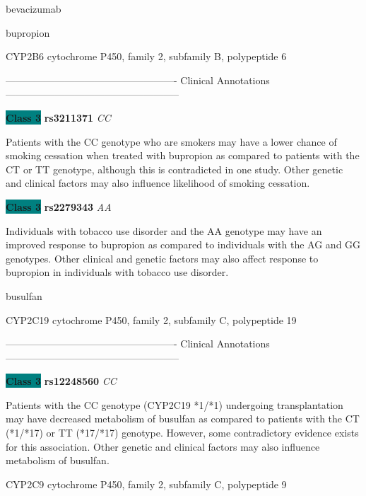 \documentclass{resume} %
\begin{document}
\begin{rSection}{ bevacizumab }
\end{rSection}\begin{rSection}{ bupropion }
\item[]

\begin{rSubsection}{ CYP2B6 }{ cytochrome P450, family 2, subfamily B, polypeptide 6 }{}{}
\item[]

\item[] ---------------------------------------------------- Clinical Annotations -----------------------------------------------------\newline
\item \textbf{\colorbox{teal} {Class 3}} \textbf{ rs3211371 } \textit{ CC }
\item[] Patients with the CC genotype who are smokers may have a lower chance of smoking cessation when treated with bupropion as compared to patients with the CT or TT genotype, although this is contradicted in one study. Other genetic and clinical factors may also influence likelihood of smoking cessation.\item \textbf{\colorbox{teal} {Class 3}} \textbf{ rs2279343 } \textit{ AA }
\item[] Individuals with tobacco use disorder and the AA genotype may have an improved response to bupropion as compared to individuals with the AG and GG genotypes. Other clinical and genetic factors may also affect response to bupropion in individuals with tobacco use disorder. 
\end{rSubsection}

\end{rSection}\begin{rSection}{ busulfan }
\item[]

\begin{rSubsection}{ CYP2C19 }{ cytochrome P450, family 2, subfamily C, polypeptide 19 }{}{}
\item[]

\item[] ---------------------------------------------------- Clinical Annotations -----------------------------------------------------\newline
\item \textbf{\colorbox{teal} {Class 3}} \textbf{ rs12248560 } \textit{ CC }
\item[] Patients with the CC genotype (CYP2C19 *1/*1) undergoing transplantation may have decreased metabolism of busulfan as compared to patients with the CT (*1/*17) or TT (*17/*17) genotype. However, some contradictory evidence exists for this association. Other genetic and clinical factors may also influence metabolism of busulfan.
\end{rSubsection}\begin{rSubsection}{ CYP2C9 }{ cytochrome P450, family 2, subfamily C, polypeptide 9 }{}{}
\item[]


\end{rSubsection}
\end{rSection}
\end{document}
